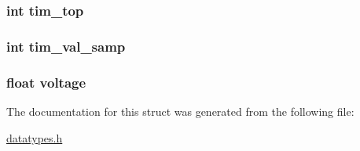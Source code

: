 \subsubsection[{tim\+\_\+top}]{\setlength{\rightskip}{0pt plus 5cm}int tim\+\_\+top}\label{structfault__data_aee6c4f422f48b4464d9daf305280967a}
\hypertarget{structfault__data_acb424372bd0ffdc122aab91b749c96dc}{}
\subsubsection[{tim\+\_\+val\+\_\+samp}]{\setlength{\rightskip}{0pt plus 5cm}int tim\+\_\+val\+\_\+samp}\label{structfault__data_acb424372bd0ffdc122aab91b749c96dc}
\hypertarget{structfault__data_a47061fcae597f83f8a0a99d4b7b5a5c1}{}
\subsubsection[{voltage}]{\setlength{\rightskip}{0pt plus 5cm}float voltage}\label{structfault__data_a47061fcae597f83f8a0a99d4b7b5a5c1}


The documentation for this struct was generated from the following file\+:\begin{DoxyCompactItemize}
\item 
\hyperlink{datatypes_8h}{datatypes.\+h}\end{DoxyCompactItemize}
